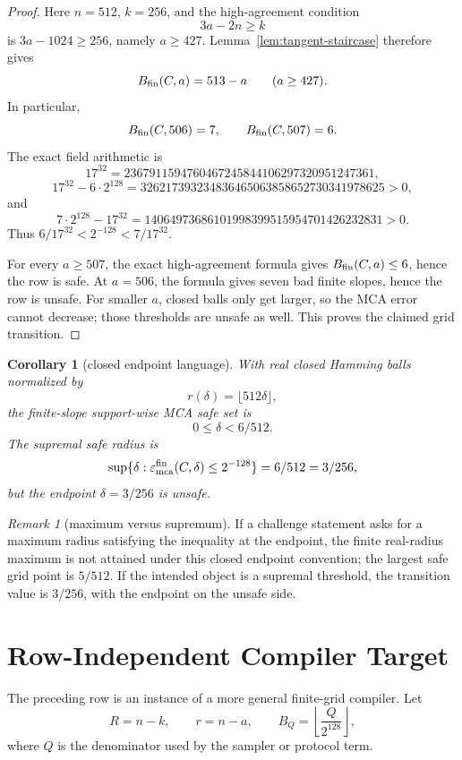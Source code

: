 \documentclass[11pt]{article}
\newtheorem{corollary}{Corollary}
\theoremstyle{remark}
\newtheorem{remark}{Remark}
\newcommand{\eps}{\varepsilon}
\begin{document}
\begin{proof}
Here \(n=512\), \(k=256\), and the high-agreement condition
\[
  3a-2n\ge k
\]
is \(3a-1024\ge256\), namely \(a\ge427\).  Lemma~\ref{lem:tangent-staircase}
therefore gives
\[
  B_{\rm fin}(C,a)=513-a
  \qquad(a\ge427).
\]
In particular,
\[
  B_{\rm fin}(C,506)=7,
  \qquad
  B_{\rm fin}(C,507)=6.
\]
The exact field arithmetic is
\[
  17^{32}
  =2367911594760467245844106297320951247361,
\]
\[
  17^{32}-6\cdot2^{128}
  =326217393234836465063858652730341978625>0,
\]
and
\[
  7\cdot2^{128}-17^{32}
  =14064973686101998399515954701426232831>0.
\]
Thus \(6/17^{32}<2^{-128}<7/17^{32}\).

For every \(a\ge507\), the exact high-agreement formula gives
\(B_{\rm fin}(C,a)\le6\), hence the row is safe.  At \(a=506\), the formula gives
seven bad finite slopes, hence the row is unsafe.  For smaller \(a\), closed
balls only get larger, so the MCA error cannot decrease; those thresholds are
unsafe as well.  This proves the claimed grid transition.
\end{proof}

\begin{corollary}[closed endpoint language]
\label{cor:endpoint}
With real closed Hamming balls normalized by
\[
  r(\delta)=\lfloor512\delta\rfloor,
\]
the finite-slope support-wise MCA safe set is
\[
  0\le\delta<6/512.
\]
The supremal safe radius is
\[
  \sup\{\delta:\eps_{\rm mca}^{\rm fin}(C,\delta)\le2^{-128}\}=6/512=3/256,
\]
but the endpoint \(\delta=3/256\) is unsafe.
\end{corollary}

\begin{remark}[maximum versus supremum]
If a challenge statement asks for a maximum radius satisfying the inequality at
the endpoint, the finite real-radius maximum is not attained under this closed
endpoint convention; the largest safe grid point is \(5/512\).  If the intended
object is a supremal threshold, the transition value is \(3/256\), with the
endpoint on the unsafe side.
\end{remark}

\section{Row-Independent Compiler Target}
\label{sec:compiler}

The preceding row is an instance of a more general finite-grid compiler.  Let
\[
  R=n-k,\qquad r=n-a,\qquad B_Q=\left\lfloor\frac{Q}{2^{128}}\right\rfloor,
\]
where \(Q\) is the denominator used by the sampler or protocol term.
\end{document}

